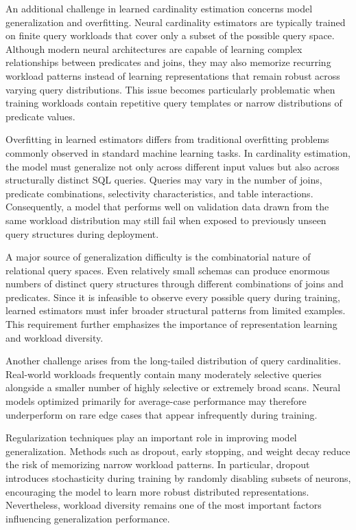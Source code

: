 An additional challenge in learned cardinality estimation concerns model generalization and overfitting. Neural cardinality estimators are typically trained on finite query workloads that cover only a subset of the possible query space. Although modern neural architectures are capable of learning complex relationships between predicates and joins, they may also memorize recurring workload patterns instead of learning representations that remain robust across varying query distributions. This issue becomes particularly problematic when training workloads contain repetitive query templates or narrow distributions of predicate values.

Overfitting in learned estimators differs from traditional overfitting problems commonly observed in standard machine learning tasks. In cardinality estimation, the model must generalize not only across different input values but also across structurally distinct SQL queries. Queries may vary in the number of joins, predicate combinations, selectivity characteristics, and table interactions. Consequently, a model that performs well on validation data drawn from the same workload distribution may still fail when exposed to previously unseen query structures during deployment.

A major source of generalization difficulty is the combinatorial nature of relational query spaces. Even relatively small schemas can produce enormous numbers of distinct query structures through different combinations of joins and predicates. Since it is infeasible to observe every possible query during training, learned estimators must infer broader structural patterns from limited examples. This requirement further emphasizes the importance of representation learning and workload diversity.

Another challenge arises from the long-tailed distribution of query cardinalities. Real-world workloads frequently contain many moderately selective queries alongside a smaller number of highly selective or extremely broad scans. Neural models optimized primarily for average-case performance may therefore underperform on rare edge cases that appear infrequently during training.

Regularization techniques play an important role in improving model generalization. Methods such as dropout, early stopping, and weight decay reduce the risk of memorizing narrow workload patterns. In particular, dropout introduces stochasticity during training by randomly disabling subsets of neurons, encouraging the model to learn more robust distributed representations. Nevertheless, workload diversity remains one of the most important factors influencing generalization performance.

